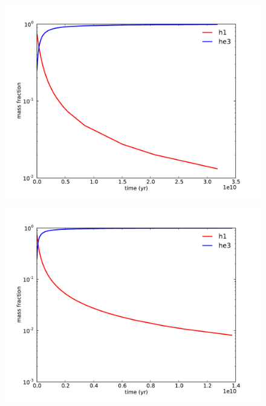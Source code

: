 \documentclass[12pt,preprint]{aastex}
\begin{document}
\begin{figure}[!ht]
\begin{center}
\includegraphics[width=5in]{T_2e7.pdf}
\end{center}
\caption{ \label{f:T_2e7}}
\end{figure}

\begin{figure}[!ht]
\begin{center}
\includegraphics[width=5in]{T_3e7.pdf}
\end{center}
\caption{ \label{f:T_3e7}}
\end{figure}
\end{document}
